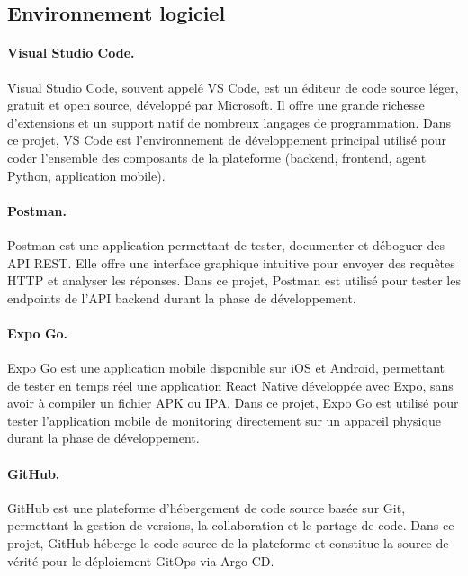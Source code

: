 
\subsection{Environnement logiciel}

\paragraph{Visual Studio Code.} Visual Studio Code, souvent appelé VS Code, est un éditeur de code source léger, gratuit et open source, développé par Microsoft. Il offre une grande richesse d'extensions et un support natif de nombreux langages de programmation. Dans ce projet, VS Code est l'environnement de développement principal utilisé pour coder l'ensemble des composants de la plateforme (backend, frontend, agent Python, application mobile).


\paragraph{Postman.} Postman est une application permettant de tester, documenter et déboguer des API REST. Elle offre une interface graphique intuitive pour envoyer des requêtes HTTP et analyser les réponses. Dans ce projet, Postman est utilisé pour tester les endpoints de l'API backend durant la phase de développement.


\paragraph{Expo Go.} Expo Go est une application mobile disponible sur iOS et Android, permettant de tester en temps réel une application React Native développée avec Expo, sans avoir à compiler un fichier APK ou IPA. Dans ce projet, Expo Go est utilisé pour tester l'application mobile de monitoring directement sur un appareil physique durant la phase de développement.


\paragraph{GitHub.} GitHub est une plateforme d'hébergement de code source basée sur Git, permettant la gestion de versions, la collaboration et le partage de code. Dans ce projet, GitHub héberge le code source de la plateforme et constitue la source de vérité pour le déploiement GitOps via Argo CD.

